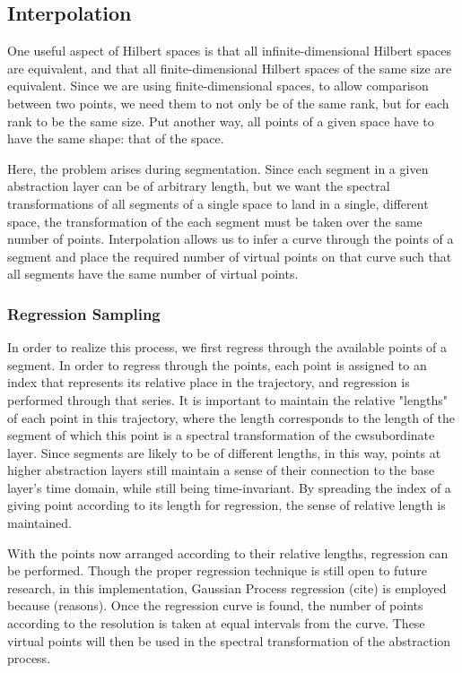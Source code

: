 \documentclass[runningheads]{llncs}
\begin{document}

\subsection{Interpolation}

One useful aspect of Hilbert spaces is that all infinite-dimensional Hilbert spaces are equivalent, and that all finite-dimensional Hilbert spaces of the same size are equivalent.  Since we are using finite-dimensional spaces, to allow comparison between two points, we need them to not only be of the same rank, but for each rank to be the same size.  Put another way, all points of a given space have to have the same shape: that of the space.

Here, the problem arises during segmentation.  Since each segment in a given abstraction layer can be of arbitrary length, but we want the spectral transformations of all segments of a single space to land in a single, different space, the transformation of the each segment must be taken over the same number of points.  Interpolation allows us to infer a curve through the points of a segment and place the required number of virtual points on that curve such that all segments have the same number of virtual points.

\subsubsection{Regression Sampling}

In order to realize this process, we first regress through the available points of a segment.  In order to regress through the points, each point is assigned to an index that represents its relative place in the trajectory, and regression is performed through that series.  It is important to maintain the relative "lengths" of each point in this trajectory, where the length corresponds to the length of the segment of which this point is a spectral transformation of the cwsubordinate layer.  Since segments are likely to be of different lengths, in this way, points at higher abstraction layers still maintain a sense of their connection to the base layer's time domain, while still being time-invariant.  By spreading the index of a giving point according to its length for regression, the sense of relative length is maintained.

With the points now arranged according to their relative lengths, regression can be performed. Though the proper regression technique is still open to future research, in this implementation, Gaussian Process regression (cite) is employed because (reasons).  Once the regression curve is found, the number of points according to the resolution is taken at equal intervals from the curve.  These virtual points will then be used in the spectral transformation of the abstraction process.
\end{document}
